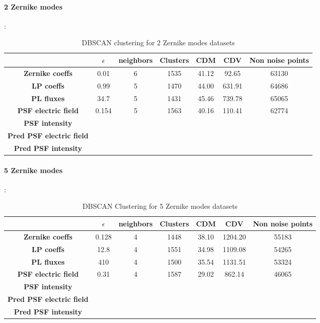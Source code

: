		\paragraph{2 Zernike modes}:
		\begin{table}[h!]
			\centering
			\begin{tabular}{|c|c|c|c|c|c|c|}
				\hline
				\textbf{} & \textbf{$\epsilon$} & \textbf{neighbors} & \textbf{Clusters} & \textbf{CDM} & \textbf{CDV} & \textbf{Non noise points}\\
				\hline
				\textbf{Zernike coeffs} & 0.01 & 6 & 1535 & 41.12 & 92.65 & 63130 \\
				\hline
				\textbf{LP coeffs} & 0.99 & 5 & 1470 & 44.00 & 631.91 & 64686 \\
				\hline
				\textbf{PL fluxes} & 34.7 & 5 & 1431 & 45.46 & 739.78 & 65065 \\
				\hline
				\textbf{PSF electric field} & 0.154 & 5 & 1563 & 40.16 & 110.41 & 62774 \\
				\hline
				\textbf{PSF intensity} &  &  &  &  &  &  \\
				\hline
				\textbf{Pred PSF electric field} &  &  &  &  &  &  \\
				\hline
				\textbf{Pred PSF intensity} &  &  &  &  &  &  \\
				\hline
			\end{tabular}
		\caption{DBSCAN clustering for 2 Zernike modes datasets}
		\end{table}
		\FloatBarrier
		
		\paragraph{5 Zernike modes}:
		\begin{table}[h!]
			\centering
			\begin{tabular}{|c|c|c|c|c|c|c|}
				\hline
				\textbf{} & \textbf{$\epsilon$} & \textbf{neighbors} & \textbf{Clusters} & \textbf{CDM} & \textbf{CDV} & \textbf{Non noise points}\\
				\hline
				\textbf{Zernike coeffs} & 0.128 & 4 & 1448 & 38.10 & 1204.20 & 55183 \\
				\hline
				\textbf{LP coeffs} & 12.8 & 4 & 1551 & 34.98 & 1109.08 & 54265 \\
				\hline
				\textbf{PL fluxes} & 410 & 4 & 1500 & 35.54 & 1131.51 & 53324 \\
				\hline
				\textbf{PSF electric field} & 0.31 & 4 & 1587 & 29.02 & 862.14 & 46065 \\
				\hline
				\textbf{PSF intensity} &  &  &  &  &  &  \\
				\hline
				\textbf{Pred PSF electric field} &  &  &  &  &  &  \\
				\hline
				\textbf{Pred PSF intensity} &  &  &  &  &  &  \\
				\hline
			\end{tabular}
		\caption{DBSCAN Clustering for 5 Zernike modes datasets}
		\end{table}
		\FloatBarrier
		
